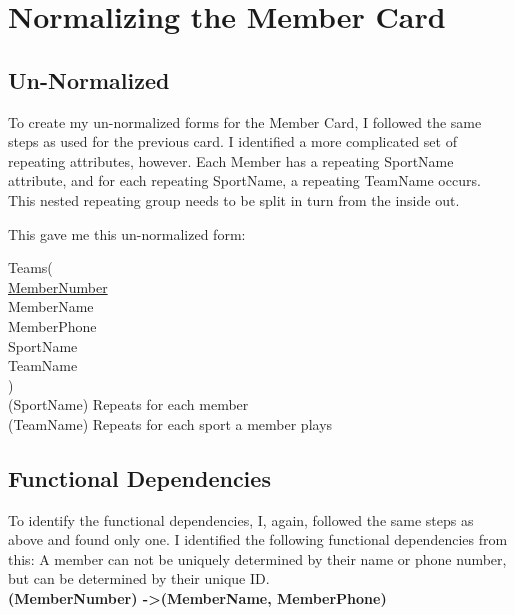 \documentclass[11pt, article]{article}
\begin{document}
	\section{Normalizing the Member Card}

\subsection{Un-Normalized}
	
	To create my un-normalized forms for the Member Card, I followed the same steps as used for the previous card. I identified a more complicated set of repeating attributes, however. Each Member has a repeating SportName attribute, and for each repeating SportName, a repeating TeamName occurs. This nested repeating group needs to be split in turn from the inside out.

This gave me this un-normalized form:

\begin{tabbing}
Teams( \newline \\
	\hspace{5mm}  \underline{MemberNumber}\\
	\hspace{5mm} MemberName                 \\
	\hspace{5mm} MemberPhone                \\
	\hspace{5mm} SportName                      \\
	\hspace{5mm} TeamName                    \\
)\\
(SportName) Repeats for each member \\
(TeamName) Repeats for each sport a member plays \\
\end{tabbing}

\subsection{Functional Dependencies}
To identify the functional dependencies, I, again, followed the same steps as above and found only one. I identified the following functional dependencies from this: \newline \newline
A member can not be uniquely determined by their name or phone number, but can be determined by their unique ID.\\
\textbf{(MemberNumber) -\textgreater (MemberName, MemberPhone)} \newline
\end{document}
